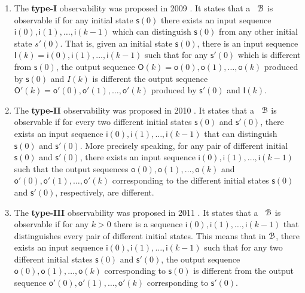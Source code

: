 \begin{enumerate}
\item The  {\bf type-I}  observability was proposed in 2009 \cite{cheng2009controllability}. It states that a \BCN\ ${\mathcal{B}}$ is observable if for any initial state   $\mathsf{s}(0)$ there exists an input sequence  $\mathsf{i}(0),\mathsf{i}(1),\ldots,\mathsf{i}(k-1)$ which can  distinguish $\mathsf{s}(0)$ from any other initial state $s'(0)$. That is,  given an initial state $\mathsf{s}(0)$, there is an input sequence $\mathsf{I}(k)=\mathsf{i}(0),\mathsf{i}(1),\ldots,\mathsf{i}(k-1)$ such that  for any  $\mathsf{s}'(0)$ which is different from $\mathsf{s}(0)$, the output sequence  $\mathsf{O}(k)=\mathsf{o}(0),\mathsf{o}(1),\ldots,\mathsf{o}(k)$ produced by  $\mathsf{s}(0)$ and $I(k)$ is different the output sequence  $\mathsf{O}'(k)=\mathsf{o}'(0),\mathsf{o}'(1),\ldots, \mathsf{o}'(k)$ produced by  $\mathsf{s}'(0)$ and $\mathsf{I}(k)$.

\item The  {\bf type-II} observability was proposed in 2010 \cite{Zhao2010Input}. It states that a \BCN\ ${\mathcal{B}}$ is observable if for every two different initial states $\mathsf{s}(0)$ and $\mathsf{s}'(0)$, there exists an input  sequence $\mathsf{i}(0),\mathsf{i}(1),\ldots, \mathsf{i}(k-1)$ that can distinguish $\mathsf{s}(0)$ and $\mathsf{s}'(0)$. More precisely speaking,  for any pair of different initial  $\mathsf{s}(0)$ and $\mathsf{s}'(0)$, 
there exists an input sequence  $\mathsf{i}(0),\mathsf{i}(1),\ldots,\mathsf{i}(k-1)$ such that the output sequences $\mathsf{o}(0),\mathsf{o}(1),\ldots,\mathsf{o}(k)$ and  $\mathsf{o}'(0),\mathsf{o}'(1),\ldots,\mathsf{o}'(k)$ corresponding to  the different initial states  $\mathsf{s}(0)$ and $\mathsf{s}'(0)$, respectively, are different.
	
\item The  {\bf type-III} observability was proposed in 2011 \cite{Cheng2011Identification}.  It states that a \BCN\ ${\mathcal{B}}$ is observable if for any $k>0$ there is a sequence $\mathsf{i}(0),\mathsf{i}(1),\ldots, \mathsf{i}(k-1)$ that distinguishes every pair of different initial states. This means that in ${\mathcal{B}}$, there exists an input  sequence  $\mathsf{i}(0),\mathsf{i}(1), \ldots,\mathsf{i}(k-1)$ such that for any two different initial states $\mathsf{s}(0)$ and $\mathsf{s}'(0)$, the output sequence $\mathsf{o}(0),\mathsf{o}(1), \ldots, \mathsf{o}(k)$  corresponding to  $\mathsf{s}(0)$  is different from the output sequence  $\mathsf{o}'(0),\mathsf{o}'(1),\ldots, \mathsf{o}'(k)$ corresponding to $\mathsf{s}'(0)$.
	

\end{enumerate}
